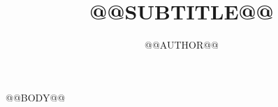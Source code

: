 \documentclass[11pt, a4paper]{article}
\title{\vspace{-1.5cm}{\Huge\bfseries @@TITLE@@} \\[0.3em]{\large @@SUBTITLE@@}}
\author{\large @@AUTHOR@@}
\date{}
\begin{document}
\maketitle
\thispagestyle{empty}
\vspace{-1em}

@@BODY@@
\end{document}
